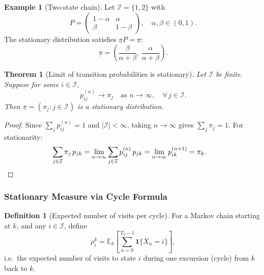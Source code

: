 \documentclass[12pt, a4paper]{article}
\theoremstyle{definition}
\newtheorem{definition}{Definition}[section]
\newtheorem{example}{Example}[section]
\theoremstyle{plain}
\newtheorem{theorem}{Theorem}[section]
\newcommand{\EE}{\mathbb{E}}
\newcommand{\II}{\mathcal{I}}
\begin{document}
\begin{example}[Two-state chain]
Let $\II = \{1,2\}$ with
\begin{equation*}
  P = \begin{pmatrix} 1-\alpha & \alpha \\ \beta & 1-\beta \end{pmatrix}, \quad \alpha,\beta \in (0,1).
\end{equation*}
The stationary distribution satisfies $\underline{\pi}P = \underline{\pi}$:
\begin{equation*}
  \underline{\pi} = \left(\frac{\beta}{\alpha+\beta},\, \frac{\alpha}{\alpha+\beta}\right).
\end{equation*}
\end{example}

\begin{theorem}[Limit of transition probabilities is stationary]
Let $\II$ be finite. Suppose for some $i \in \II$,
\begin{equation*}
  p_{ij}^{(n)} \to \pi_j \quad \text{as } n \to \infty, \quad \forall\, j \in \II.
\end{equation*}
Then $\underline{\pi} = (\pi_j : j \in \II)$ is a stationary distribution.
\end{theorem}

\begin{proof}
Since $\sum_{j} p_{ij}^{(n)} = 1$ and $|\II| < \infty$, taking $n\to\infty$ gives $\sum_j \pi_j = 1$. For stationarity:
\begin{align*}
  \sum_{j \in \II} \pi_j\, p_{jk} &= \lim_{n\to\infty} \sum_{j \in \II} p_{ij}^{(n)}\, p_{jk} = \lim_{n\to\infty} p_{ik}^{(n+1)} = \pi_k. \qedhere
\end{align*}
\end{proof}

\subsubsection{Stationary Measure via Cycle Formula}

\begin{definition}[Expected number of visits per cycle]
For a Markov chain starting at $k$, and any $i \in \II$, define
\begin{equation*}
  \rho_i^k = \EE_k\!\left[\sum_{n=0}^{T_k - 1} \mathbf{1}\{X_n = i\}\right],
\end{equation*}
i.e.\ the expected number of visits to state $i$ during one excursion (cycle) from $k$ back to $k$.
\end{definition}
\end{document}
